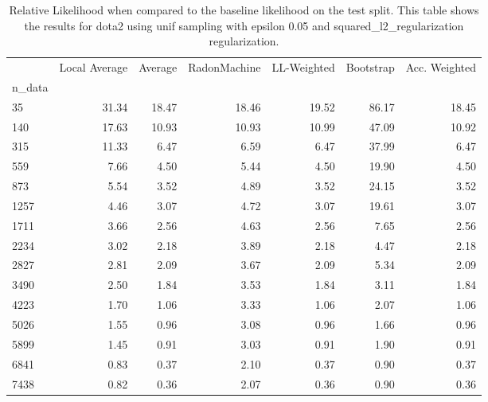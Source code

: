\begin{table}
\centering
\caption{Relative Likelihood when compared to the baseline likelihood on the test split. This table shows the results for  dota2 using  unif sampling with epsilon  0.05 and  squared_l2_regularization regularization.}
\label{tab:7}
\begin{tabular}{lrrrrrr}
\toprule
{} &  Local Average &  Average &  RadonMachine &  LL-Weighted &  Bootstrap &  Acc. Weighted \\
n\_data &                &          &               &              &            &                \\
\midrule
35     &          31.34 &    18.47 &         18.46 &        19.52 &      86.17 &          18.45 \\
140    &          17.63 &    10.93 &         10.93 &        10.99 &      47.09 &          10.92 \\
315    &          11.33 &     6.47 &          6.59 &         6.47 &      37.99 &           6.47 \\
559    &           7.66 &     4.50 &          5.44 &         4.50 &      19.90 &           4.50 \\
873    &           5.54 &     3.52 &          4.89 &         3.52 &      24.15 &           3.52 \\
1257   &           4.46 &     3.07 &          4.72 &         3.07 &      19.61 &           3.07 \\
1711   &           3.66 &     2.56 &          4.63 &         2.56 &       7.65 &           2.56 \\
2234   &           3.02 &     2.18 &          3.89 &         2.18 &       4.47 &           2.18 \\
2827   &           2.81 &     2.09 &          3.67 &         2.09 &       5.34 &           2.09 \\
3490   &           2.50 &     1.84 &          3.53 &         1.84 &       3.11 &           1.84 \\
4223   &           1.70 &     1.06 &          3.33 &         1.06 &       2.07 &           1.06 \\
5026   &           1.55 &     0.96 &          3.08 &         0.96 &       1.66 &           0.96 \\
5899   &           1.45 &     0.91 &          3.03 &         0.91 &       1.90 &           0.91 \\
6841   &           0.83 &     0.37 &          2.10 &         0.37 &       0.90 &           0.37 \\
7438   &           0.82 &     0.36 &          2.07 &         0.36 &       0.90 &           0.36 \\
\bottomrule
\end{tabular}
\end{table}
